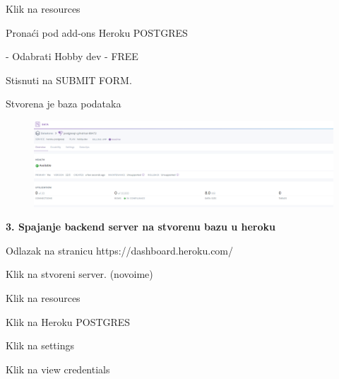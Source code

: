 \begin{packed_item}
\begin{packed_enum}
							\item Klik na resources
							
							\item Pronaći pod add-ons  Heroku POSTGRES
							
							    - Odabrati Hobby dev - FREE
							  
							
							\item Stisnuti na SUBMIT FORM.
							
							\item Stvorena je baza podataka
							    
							    \begin{figure}[H]
                        			\hspace*{-1.5cm}
                        			\includegraphics[scale=0.3]{dijagrami/baza.PNG} %
                        			\centering
                        			\label{fig:promjene}
                        		\end{figure}

						\end{packed_enum}
						
						
						\item  \textbf{3. Spajanje backend server na stvorenu bazu u heroku}
						\item[] \begin{packed_enum}
	
							\item Odlazak na stranicu  https://dashboard.heroku.com/
							
							\item Klik na stvoreni server. (novoime)
							
							\item Klik na resources
							
							\item Klik na Heroku POSTGRES
							
							\item Klik na settings
							
							\item Klik na view credentials
							

\end{packed_enum}
\end{packed_item}
